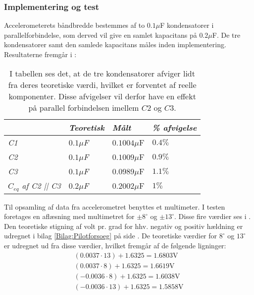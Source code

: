 \subsubsection{Implementering og test}
Accelerometerets båndbredde bestemmes af to $0.1\mu$F kondensatorer i parallelforbindelse, som derved vil give en samlet kapacitans på  $0.2\mu$F. De tre kondensatorer samt den samlede kapacitans måles inden implementering. Resultaterne fremgår i  :
\begin{table}[H]
	\centering
	\begin{tabular}{|l|l|l|l|}\hline
		& \textit{Teoretisk} & \textit{Målt} & \textit{\% afvigelse} \\ \hline
		\textit{C1}       & \textit{$0.1\mu$F} & $0.1004\mu$F  & $0.4\%$               \\ \hline		
		\textit{C2}       & \textit{$0.1\mu$F} & $0.1009\mu$F  & $0.9\%$               \\ \hline
		\textit{C3}       & \textit{$0.1\mu$F} & $0.0989\mu$F  & $1.1\%$               \\ \hline
		\textit{$C_{eq}$ af C2 || C3} & \textit{$0.2\mu$F} & $0.2002\mu$F  & $1\%$                \\ \hline
	\end{tabular}
	\caption{I tabellen ses det, at de tre kondensatorer afviger lidt fra deres teoretiske værdi, hvilket er forventet af reelle komponenter. Disse afvigelser vil derfor have en effekt på parallel forbindelsen imellem $C2$ og $C3$.}
	\label{Tab:Acc_kondensator}
\end{table}
\noindent Til opsamling af data fra accelerometret benyttes et multimeter. I testen foretages en aflæsning med multimetret for $\pm8^\circ$ og $\pm13^\circ$. Disse fire værdier ses i . Den teoretiske stigning af volt pr. grad for hhv. negativ og positiv hældning er udregnet i bilag \ref{Bilag:Pilotforsoeg} på side \pageref{Bilag:Pilotforsoeg}. De teoretiske værdier for $8^\circ$ og $13^\circ$ er udregnet ud fra disse værdier, hvilket fremgår af de følgende ligninger:
\begin{align}
(0.0037 \cdot 13) + 1.6325 = 1.6803\text{V} \\
(0.0037 \cdot 8) + 1.6325 = 1.6619\text{V}  \\
(-0.0036 \cdot 8) + 1.6325 = 1.6038\text{V}  \\
(-0.0036 \cdot 13) + 1.6325 = 1.5858\text{V}
\end{align}
